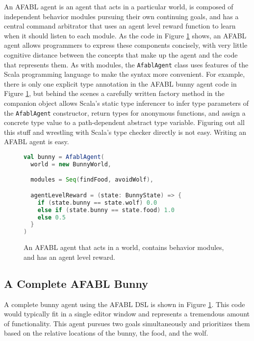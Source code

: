 An AFABL agent is an agent that acts in a particular world, is composed of independent behavior modules pursuing their own continuing goals, and has a central command arbitrator that uses an agent level reward function to learn when it should listen to each module. As the code in Figure \ref{fig:afabl-bunny-code} shows, an AFABL agent allows programmers to express these components concisely, with very little cognitive distance between the concepts that make up the agent and the code that represents them. As with modules, the {\tt AfablAgent} class uses features of the Scala programming language to make the syntax more convenient. For example, there is only one explicit type annotation in the AFABL bunny agent code in Figure \ref{fig:afabl-bunny-code}, but behind the scenes a carefully written factory method in the companion object allows Scala's static type inferencer to infer type parameters of the {\tt AfablAgent} constructor, return types for anonymous functions, and assign a concrete type value to a path-dependent abstract type variable. Figuring out all this stuff and wrestling with Scala's type checker directly is not easy. Writing an AFABL agent is easy.

\begin{figure}[!h]
\begin{center}

\begin{lstlisting}[language=Scala]
val bunny = AfablAgent(
  world = new BunnyWorld,

  modules = Seq(findFood, avoidWolf),

  agentLevelReward = (state: BunnyState) => {
    if (state.bunny == state.wolf) 0.0
    else if (state.bunny == state.food) 1.0
    else 0.5
  }
)
\end{lstlisting}

\caption{An AFABL agent that acts in a world, contains behavior modules, and has an agent level reward.}
\end{center}
\label{fig:afabl-bunny-code}
\end{figure}



\subsection{A Complete AFABL Bunny}

A complete bunny agent using the AFABL DSL is shown in Figure \ref{fig:afabl-bunny-code}. This code would typically fit in a single editor window and represents a tremendous amount of functionality. This agent pursues two goals simultaneously and prioritizes them based on the relative locations of the bunny, the food, and the wolf.

